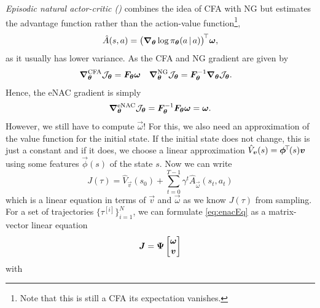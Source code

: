 			\emph{Episodic natural actor-critic ()} combines the idea of \ac{CFA} with \ac{NG} but estimates the advantage function rather than the action-value function\footnote{Note that this is still a \ac{CFA} its expectation vanishes.},
			\begin{equation}
				\hat{A}(s, a) = \bigl( \grad_{\bm{\theta}} \log \pi_{\bm{\theta}}(a \,\vert\, a) \bigr)^{{\!\top\!}\,} \bm{\omega},
			\end{equation}
			as it usually has lower variance. As the \ac{CFA} and \ac{NG} gradient are given by
			\begin{align}
				\grad_{\bm{\theta}}^\mathrm{CFA} \mathcal{J}_{\bm{\theta}} &= \bm{F}_{\bm{\theta}} \bm{\omega} &
				\grad_{\bm{\theta}}^\mathrm{NG} \mathcal{J}_{\bm{\theta}} &= \bm{F}_{\bm{\theta}}^{-1} \grad_{\bm{\theta}} \mathcal{J}_{\bm{\theta}}.
			\end{align}
			Hence, the \ac{eNAC} gradient is simply
			\begin{equation}
				\grad_{\bm{\theta}}^\mathrm{eNAC} \mathcal{J}_{\bm{\theta}}
					= \bm{F}_{\bm{\theta}}^{-1} \bm{F}_{\bm{\theta}} \bm{\omega}
					= \bm{\omega}.
			\end{equation}
			However, we still have to compute \(\vec{\omega}\)! For this, we also need an approximation of the value function for the initial state. If the initial state does not change, this is just a constant and if it does, we choose a linear approximation \( \hat{V}_{\bm{v}}(s) = \bm{\phi}^{\!\top\!}(s) \bm{v} \) using some features \(\vec{\phi}(s)\) of the state \(s\). Now we can write
			\begin{equation}
				J(\tau) = \hat{V}_{\vec{v}}(s_0) + \sum_{t = 0}^{T - 1} \gamma^t \hat{A}_{\vec{\omega}}(s_t, a_t)  \label{eq:enacEq}
			\end{equation}
			which is a linear equation in terms of \(\vec{v}\) and \(\vec{\omega}\) as we know \(J(\tau)\) from sampling. For a set of trajectories \( \bigl\{ \tau^{[i]} \bigr\}_{i = 1}^{N} \), we can formulate \eqref{eq:enacEq} as a matrix-vector linear equation
			\begin{equation}
				\bm{J} = \bm{\Psi} \begin{bmatrix} \bm{\omega} \\ \bm{v} \end{bmatrix}
			\end{equation}
			with
